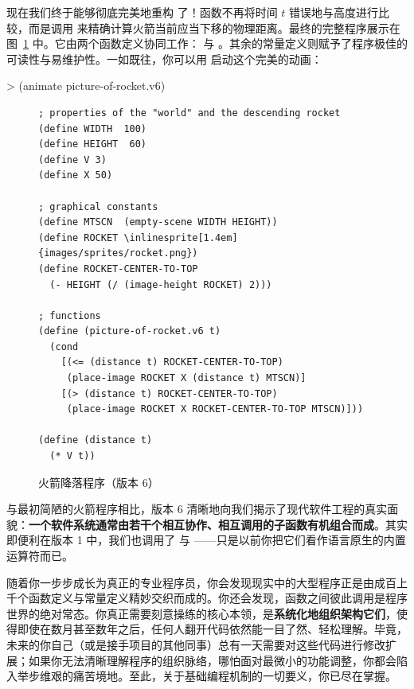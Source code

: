 现在我们终于能够彻底完美地重构  了！函数不再将时间 $t$ 错误地与高度进行比较，而是调用  来精确计算火箭当前应当下移的物理距离。最终的完整程序展示在图~\ref{fig:rocket_v6} 中。它由两个函数定义协同工作： 与 。其余的常量定义则赋予了程序极佳的可读性与易维护性。一如既往，你可以用  启动这个完美的动画：
\begin{replbox}
> (animate picture-of-rocket.v6)
\end{replbox}

\begin{figure}[htbp]
  \centering
\begin{stepperbox}[unbreakable]
\begin{Verbatim}[commandchars=\\\{\}, fontsize=\scriptsize]
; properties of the "world" and the descending rocket
(define WIDTH  100)
(define HEIGHT  60)
(define V 3)
(define X 50)

; graphical constants
(define MTSCN  (empty-scene WIDTH HEIGHT))
(define ROCKET \inlinesprite[1.4em]{images/sprites/rocket.png})
(define ROCKET-CENTER-TO-TOP
  (- HEIGHT (/ (image-height ROCKET) 2)))

; functions
(define (picture-of-rocket.v6 t)
  (cond
    [(<= (distance t) ROCKET-CENTER-TO-TOP)
     (place-image ROCKET X (distance t) MTSCN)]
    [(> (distance t) ROCKET-CENTER-TO-TOP)
     (place-image ROCKET X ROCKET-CENTER-TO-TOP MTSCN)]))

(define (distance t)
  (* V t))
\end{Verbatim}
\end{stepperbox}
  \caption{火箭降落程序（版本 6）}
  \label{fig:rocket_v6}
\end{figure}

与最初简陋的火箭程序相比，版本 6 清晰地向我们揭示了现代软件工程的真实面貌：\textbf{一个软件系统通常由若干个相互协作、相互调用的子函数有机组合而成}。其实即便利在版本 1 中，我们也调用了 \code{+} 与 \code{/}——只是以前你把它们看作语言原生的内置运算符而已。

随着你一步步成长为真正的专业程序员，你会发现现实中的大型程序正是由成百上千个函数定义与常量定义精妙交织而成的。你还会发现，函数之间彼此调用是程序世界的绝对常态。你真正需要刻意操练的核心本领，是\textbf{系统化地组织架构它们}，使得即使在数月甚至数年之后，任何人翻开代码依然能一目了然、轻松理解。毕竟，未来的你自己（或是接手项目的其他同事）总有一天需要对这些代码进行修改扩展；如果你无法清晰理解程序的组织脉络，哪怕面对最微小的功能调整，你都会陷入举步维艰的痛苦境地。至此，关于基础编程机制的一切要义，你已尽在掌握。


